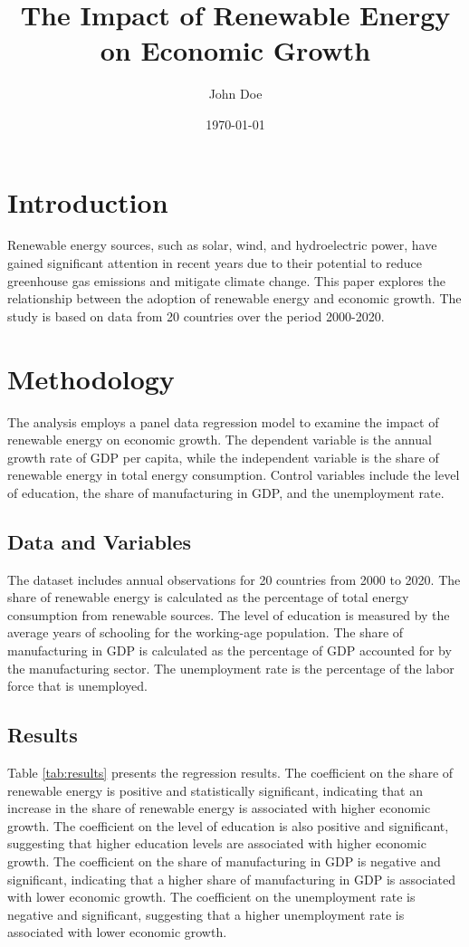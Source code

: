 \documentclass[12pt]{article}
\title{The Impact of Renewable Energy on Economic Growth}
\author{John Doe}
\date{\today}
\begin{document}
\maketitle

\section{Introduction}

Renewable energy sources, such as solar, wind, and hydroelectric power, have gained significant attention in recent years due to their potential to reduce greenhouse gas emissions and mitigate climate change. This paper explores the relationship between the adoption of renewable energy and economic growth. The study is based on data from 20 countries over the period 2000-2020.

\section{Methodology}

The analysis employs a panel data regression model to examine the impact of renewable energy on economic growth. The dependent variable is the annual growth rate of GDP per capita, while the independent variable is the share of renewable energy in total energy consumption. Control variables include the level of education, the share of manufacturing in GDP, and the unemployment rate.

\subsection{Data and Variables}

The dataset includes annual observations for 20 countries from 2000 to 2020. The share of renewable energy is calculated as the percentage of total energy consumption from renewable sources. The level of education is measured by the average years of schooling for the working-age population. The share of manufacturing in GDP is calculated as the percentage of GDP accounted for by the manufacturing sector. The unemployment rate is the percentage of the labor force that is unemployed.

\subsection{Results}

Table \ref{tab:results} presents the regression results. The coefficient on the share of renewable energy is positive and statistically significant, indicating that an increase in the share of renewable energy is associated with higher economic growth. The coefficient on the level of education is also positive and significant, suggesting that higher education levels are associated with higher economic growth. The coefficient on the share of manufacturing in GDP is negative and significant, indicating that a higher share of manufacturing in GDP is associated with lower economic growth. The coefficient on the unemployment rate is negative and significant, suggesting that a higher unemployment rate is associated with lower economic growth.
\end{document}

